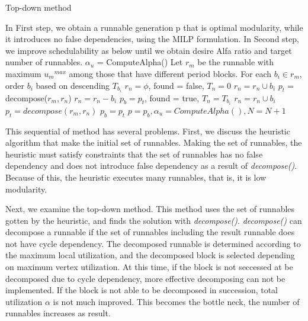 \documentclass[conference,compsoc]{IEEEtran}
\begin{document}
\begin{algorithm}                      
\caption{Top-down method}         
\label{alg2}                        
  
\begin{algorithmic}[1]
\STATE In First step, we obtain a runnable generation p that is optimal modularity, while it introduces no false dependencies, using the MILP formulation.
\STATE In Second step, we improve schedulability as below until we obtain desire Alfa ratio and target number of runnables.
\STATE $\alpha_u$ = ComputeAlpha()
	\STATE Let $r_m$ be the runnable with maximum $u{_m}^{max}$ among those that have different period blocks.
	\STATE For each $b_i \in r_m$, order $b_i$ based on descending $T_{b_i}$
	\STATE $r_n = \phi$, found = false, $T_n = 0$
			\STATE $r_n = r_n \cup b_i$
			\STATE $p_t = $ decompose($r_m,r_n$)
				\STATE $r_n = r_n - b_i$
			\ELSE 
			\STATE $p_b = p_t$, found = true, $T_n = T_{b_i}$
			\ENDIF
		\ELSE
				\STATE $r_n = r_n \cup b_i$
				\STATE $p_t = decompose(r_m,r_n)$
			\ELSE
				\STATE $p_b = p_t$
			\ENDIF
		\ENDIF
	\ENDFOR
	\STATE $p = p_b, \alpha_u = ComputeAlpha(), N = N + 1$
\ENDWHILE
\end{algorithmic}
\end{algorithm}

 This sequential of method has several problems.
First, we discuss the heuristic algorithm that make the initial set of runnables.
Making the set of runnables, the heuristic must satisfy constraints that the set of runnables has no false dependency and does not introduce false dependency as a result of {\it decompose()}.
Because of this, the heuristic executes many runnables, that is, it is low modularity.

Next, we examine the top-down method.
This method uses the set of runnables gotten by the heuristic, and finds the solution with {\it decompose()}.
{\it decompose()} can decompose a runnable if the set of runnables including the result runnable does not have cycle dependency.
The decomposed runnable is determined according to the maximum local utilization, and the decomposed block is selected depending on maximum vertex utilization.
At this time, if the block is not seccessed at be decomposed due to cycle dependency, more effective decomposing can not be implemented.
If the block is not able to be decomposed in succession, total utilization $\alpha$ is not much improved.
This becomes the bottle neck, the number of runnables increases as result.
\end{document}
